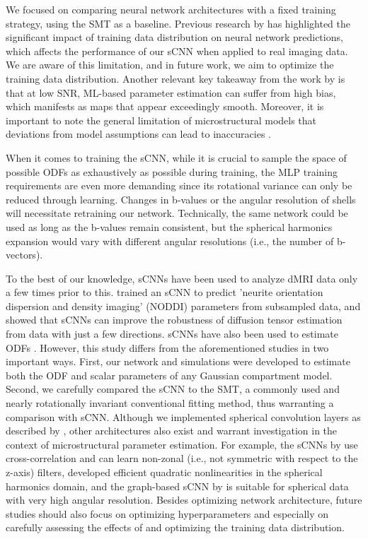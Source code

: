 \documentclass[10pt, letterpaper, oneside]{article}
\begin{document}
We focused on comparing neural network architectures with a fixed training strategy, using the SMT as a baseline. Previous research by \cite{gyori2022training} has highlighted the significant impact of training data distribution on neural network predictions, which affects the performance of our sCNN when applied to real imaging data. We are aware of this limitation, and in future work, we aim to optimize the training data distribution. Another relevant key takeaway from the work by \cite{gyori2022training} is that at low SNR, ML-based parameter estimation can suffer from high bias, which manifests as maps that appear exceedingly smooth. Moreover, it is important to note the general limitation of microstructural models that deviations from model assumptions can lead to inaccuracies \citep{lampinen2017neurite, henriques2019microscopic, kerkela2021comparative}.

When it comes to training the sCNN, while it is crucial to sample the space of possible ODFs as exhaustively as possible during training, the MLP training requirements are even more demanding since its rotational variance can only be reduced through learning. Changes in b-values or the angular resolution of shells will necessitate retraining our network. Technically, the same network could be used as long as the b-values remain consistent, but the spherical harmonics expansion would vary with different angular resolutions (i.e., the number of b-vectors).

To the best of our knowledge, sCNNs have been used to analyze dMRI data only a few times prior to this. \cite{sedlar2021spherical} trained an sCNN to predict 'neurite orientation dispersion and density imaging' (NODDI) \citep{zhang2012noddi} parameters from subsampled data, and \cite{goodwin2022can} showed that sCNNs can improve the robustness of diffusion tensor estimation from data with just a few directions. sCNNs have also been used to estimate ODFs \citep{sedlar2021diffusion, elaldi2021equivariant}. However, this study differs from the aforementioned studies in two important ways. First, our network and simulations were developed to estimate both the ODF and scalar parameters of any Gaussian compartment model. Second, we carefully compared the sCNN to the SMT, a commonly used and nearly rotationally invariant conventional fitting method, thus warranting a comparison with sCNN. Although we implemented spherical convolution layers as described by \cite{esteves2018learning}, other architectures also exist and warrant investigation in the context of microstructural parameter estimation. For example, the sCNNs by \cite{cohen2018spherical} use cross-correlation and can learn non-zonal (i.e., not symmetric with respect to the z-axis) filters, \cite{kondor2018clebsch} developed efficient quadratic nonlinearities in the spherical harmonics domain, and the graph-based sCNN by \cite{perraudin2019deepsphere} is suitable for spherical data with very high angular resolution. Besides optimizing network architecture, future studies should also focus on optimizing hyperparameters and especially on carefully assessing the effects of and optimizing the training data distribution.
\end{document}
